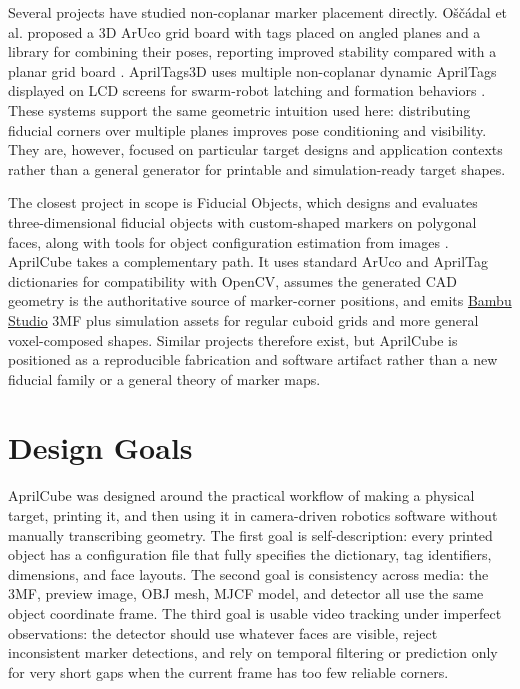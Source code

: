 \documentclass[conference]{IEEEtran}
\newcommand{\BambuStudio}{\href{https://github.com/bambulab/BambuStudio}{Bambu Studio}}
\begin{document}
Several projects have studied non-coplanar marker placement directly. O{\v{s}}{\v{c}}{\'a}dal et al. proposed a 3D ArUco grid board with tags placed on angled planes and a library for combining their poses, reporting improved stability compared with a planar grid board \cite{oscadal2020}. AprilTags3D uses multiple non-coplanar dynamic AprilTags displayed on LCD screens for swarm-robot latching and formation behaviors \cite{apriltags3d}. These systems support the same geometric intuition used here: distributing fiducial corners over multiple planes improves pose conditioning and visibility. They are, however, focused on particular target designs and application contexts rather than a general generator for printable and simulation-ready target shapes.

The closest project in scope is Fiducial Objects, which designs and evaluates three-dimensional fiducial objects with custom-shaped markers on polygonal faces, along with tools for object configuration estimation from images \cite{fiducialobjects}. AprilCube takes a complementary path. It uses standard ArUco and AprilTag dictionaries for compatibility with OpenCV, assumes the generated CAD geometry is the authoritative source of marker-corner positions, and emits \BambuStudio{} 3MF plus simulation assets for regular cuboid grids and more general voxel-composed shapes. Similar projects therefore exist, but AprilCube is positioned as a reproducible fabrication and software artifact rather than a new fiducial family or a general theory of marker maps.

\section{Design Goals}
AprilCube was designed around the practical workflow of making a physical target, printing it, and then using it in camera-driven robotics software without manually transcribing geometry. The first goal is self-description: every printed object has a configuration file that fully specifies the dictionary, tag identifiers, dimensions, and face layouts. The second goal is consistency across media: the 3MF, preview image, OBJ mesh, MJCF model, and detector all use the same object coordinate frame. The third goal is usable video tracking under imperfect observations: the detector should use whatever faces are visible, reject inconsistent marker detections, and rely on temporal filtering or prediction only for very short gaps when the current frame has too few reliable corners.
\end{document}
